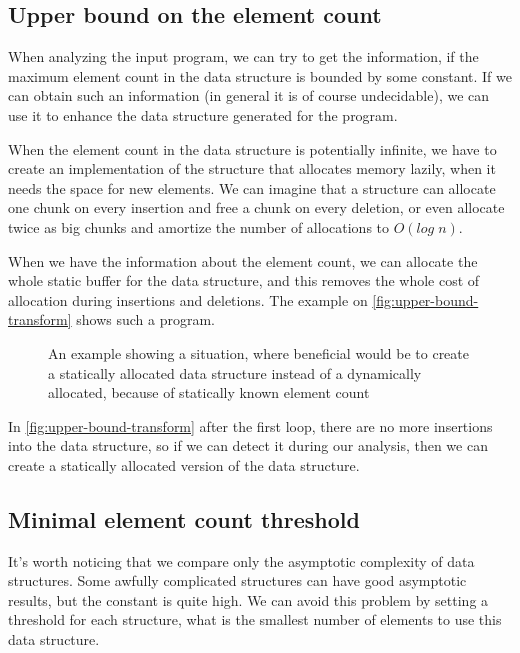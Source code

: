 \documentclass[a4paper,11pt]{article}
\begin{document}
            
	\subsection{Upper bound on the element count}

		When analyzing the input program, we can try to get the information, if the maximum element count in the
		data structure is bounded by some constant. If we can obtain such an information (in general it is of course undecidable), we can use it to enhance the data structure generated for the program.

		When the element count in the data structure is potentially infinite, we have to create an
		implementation of the structure that allocates memory lazily, when it needs the space for new elements.
		We can imagine that a structure can allocate one chunk on every insertion and free a chunk on every
		deletion, or even allocate twice as big chunks and amortize the number of allocations to $O(log \; n)$.

		When we have the information about the element count, we can allocate the whole static buffer for the
		data structure, and this removes the whole cost of allocation during insertions and deletions. The
		example on \autoref{fig:upper-bound-transform} shows such a program.

		\begin{figure}
			

			\caption{An example showing a situation, where beneficial would be to create a statically allocated data
			structure instead of a dynamically allocated, because of statically known element count}

			\label{fig:upper-bound-transform}
		\end{figure}

		In \autoref{fig:upper-bound-transform} after the first loop, there are no more insertions into the data
		structure, so if we can detect it during our analysis, then we can create a statically allocated version of the data structure.

	\subsection{Minimal element count threshold}

		It's worth noticing that we compare only the asymptotic complexity of data structures. Some awfully
		complicated structures can have good asymptotic results, but the constant is quite high. We can avoid
		this problem by setting a threshold for each structure, what is the smallest number of elements to use
		this data structure.
\end{document}
